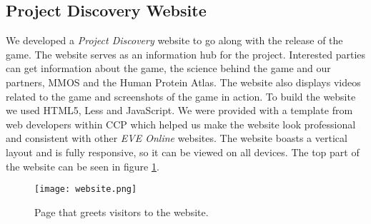 \subsection{Project Discovery Website}
We developed a \emph{Project Discovery} website to go along with the release of the game. The website serves as an information hub for the project. Interested parties can get information about the game, the science behind the game and our partners, MMOS and the Human Protein Atlas. The website also displays videos related to the game and screenshots of the game in action. To build the website we used HTML5, Less and JavaScript. We were provided with a template from web developers within CCP which helped us make the website look professional and consistent with other \emph{EVE Online} websites. The website boasts a vertical layout and is fully responsive, so it can be viewed on all devices. The top part of the website can be seen in figure \ref{fig:website}.

\begin{figure}[H]
\centering
\graphicspath{ {./graphics/} }
\centerline{\texttt{[image: website.png]}}
\caption{\label{fig:website} Page that greets visitors to the website.}
\end{figure}
